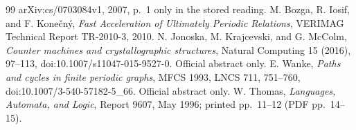 \documentclass[11pt]{amsart}
\theoremstyle{definition}\newtheorem{definition}{Definition}
\begin{document}
\begin{thebibliography}{99}
arXiv:cs/0703084v1, 2007, p.~1 only in the stored reading.
 M. Bozga, R. Iosif, and F. Kone\v{c}n\'y,
\emph{Fast Acceleration of Ultimately Periodic Relations},
VERIMAG Technical Report TR-2010-3, 2010.
 N. Jonoska, M. Krajcevski, and G. McColm,
\emph{Counter machines and crystallographic structures},
Natural Computing 15 (2016), 97--113,
doi:10.1007/s11047-015-9527-0. Official abstract only.
 E. Wanke, \emph{Paths and cycles in finite periodic graphs},
MFCS 1993, LNCS 711, 751--760,
doi:10.1007/3-540-57182-5\_66. Official abstract only.
 W. Thomas, \emph{Languages, Automata, and Logic},
Report 9607, May 1996; printed pp.~11--12 (PDF pp.~14--15).
\end{thebibliography}
\end{document}
